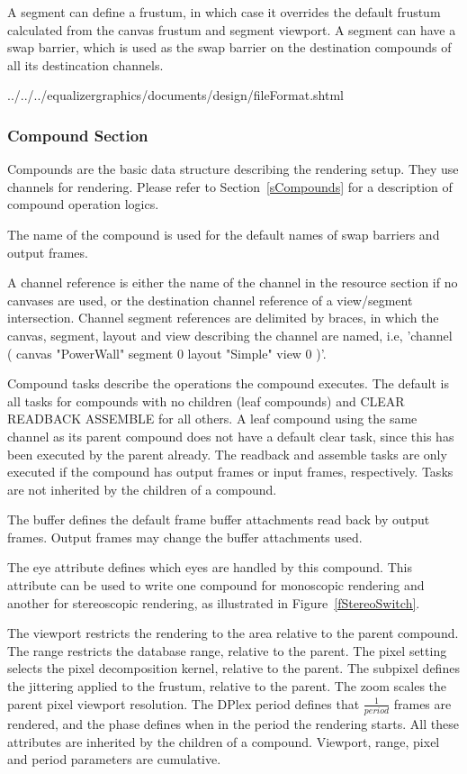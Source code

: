 \documentclass[10pt,a4]{scrartcl}
\newcommand{\fig}[1]{Figure~\ref{#1}}
\newcommand{\sref}[1]{Section~\ref{#1}}
\begin{document}
A segment can define a frustum, in which case it overrides the default
frustum calculated from the canvas frustum and segment viewport. A segment can
have a swap barrier, which is used as the swap barrier on the destination
compounds of all its destincation channels.

{\footnotesize
  {../../../equalizergraphics/documents/design/fileFormat.shtml}}

\subsubsection{Compound Section}

Compounds are the basic data structure describing the rendering
setup. They use channels for rendering. Please refer to
\sref{sCompounds} for a description of compound operation logics.

The name of the compound is used for the default names of swap barriers
and output frames.

A channel reference is either the name of the channel in the resource
section if no canvases are used, or the destination channel reference of
a view/segment intersection. Channel segment references are delimited by
braces, in which the canvas, segment, layout and view describing the
channel are named, i.e, 'channel ( canvas "PowerWall" segment 0 layout
"Simple" view 0 )'.

Compound tasks describe the operations the compound executes. The default is all
tasks for compounds with no children (leaf compounds) and \textsf{CLEAR READBACK
  ASSEMBLE} for all others. A leaf compound using the same channel as its parent
compound does not have a default clear task, since this has been executed by the
parent already. The readback and assemble tasks are only executed if the
compound has output frames or input frames, respectively. Tasks are not
inherited by the children of a compound.

The buffer defines the default frame buffer attachments read back by
output frames. Output frames may change the buffer attachments used.

The eye attribute defines which eyes are handled by this compound. This
attribute can be used to write one compound for monoscopic rendering and another
for stereoscopic rendering, as illustrated in \fig{fStereoSwitch}.

The viewport restricts the rendering to the area relative to the parent
compound. The range restricts the database range, relative to the
parent. The pixel setting selects the pixel decomposition kernel,
relative to the parent. The subpixel defines the jittering applied to
the frustum, relative to the parent. The zoom scales the parent
pixel viewport resolution. The DPlex period defines that $\frac{1}{period}$
frames are rendered, and the phase defines when in the period the
rendering starts. All these attributes are inherited by the children of
a compound. Viewport, range, pixel and period parameters are cumulative.
\end{document}

